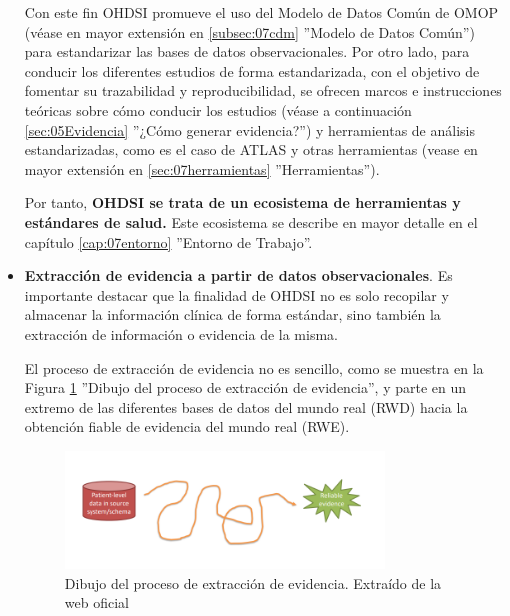 \begin{itemize}
    Con este fin OHDSI promueve el uso del Modelo de Datos Común de OMOP (véase en mayor extensión en \ref{subsec:07cdm} ''Modelo de Datos Común'') para estandarizar las bases de datos observacionales. Por otro lado, para conducir los diferentes estudios de forma estandarizada, con el objetivo de fomentar su trazabilidad y reproducibilidad, se ofrecen marcos e instrucciones teóricas sobre cómo conducir los estudios (véase a continuación \ref{sec:05Evidencia} ''¿Cómo generar evidencia?'') y herramientas de análisis estandarizadas, como es el caso de ATLAS y otras herramientas (vease en mayor extensión en \ref{sec:07herramientas} ''Herramientas''). 
    
    Por tanto, \textbf{OHDSI se trata de un ecosistema de herramientas y estándares de salud.} Este ecosistema se describe en mayor detalle en el capítulo \ref{cap:07entorno} ''Entorno de Trabajo''.

    \item \textbf{Extracción de evidencia a partir de datos observacionales}. Es importante destacar que la finalidad de OHDSI no es solo recopilar y almacenar la información clínica de forma estándar, sino también la extracción de información o evidencia de la misma. 
    
    El proceso de extracción de evidencia no es sencillo, como se muestra en la Figura \ref{fig:drawinJourney} ''Dibujo del proceso de extracción de evidencia'', y parte en un extremo de las diferentes bases de datos del mundo real (RWD) hacia la obtención fiable de evidencia del mundo real (RWE). %

\begin{figure}[H]
    \centering
    \includegraphics[width=0.80\textwidth]{figures/drawinJourney.png}
     \caption{Dibujo del proceso de extracción de evidencia. Extraído de la web oficial \cite{OHDSIwebsite}}
    \label{fig:drawinJourney}
\end{figure}


\end{itemize}

